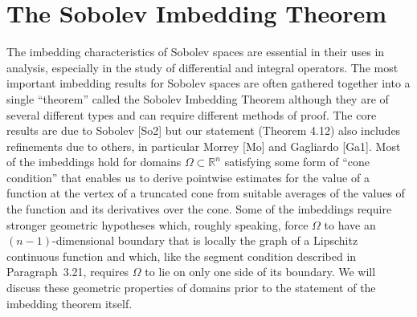 \chapter{The Sobolev Imbedding Theorem}


\begin{para}
  The imbedding characteristics of Sobolev spaces are essential in their uses in analysis, 
  especially in the study of differential and integral operators. The most important imbedding 
  results for Sobolev spaces are often gathered together into a single ``theorem'' called the 
  Sobolev Imbedding Theorem although they are of several different types and can require different 
  methods of proof. The core results are due to Sobolev [So2] but our statement (Theorem 4.12) 
  also includes refinements due to others, in particular Morrey [Mo] and Gagliardo [Ga1].
  Most of the imbeddings hold for domains $\Omega \subset \mathbb{R}^n$ satisfying some form of 
  ``cone condition'' that enables us to derive pointwise estimates for the value of a function at 
  the vertex of a truncated cone from suitable averages of the values of the function and its 
  derivatives over the cone. Some of the imbeddings require stronger geometric hypotheses which, 
  roughly speaking, force $\Omega$ to have an $(n-1)$-dimensional boundary that is locally the 
  graph of a Lipschitz continuous function and which, like the segment condition described in 
  Paragraph~3.21, requires $\Omega$ to lie on only one side of its boundary. We will discuss these 
  geometric properties of domains prior to the statement of the imbedding theorem itself.
\end{para}


